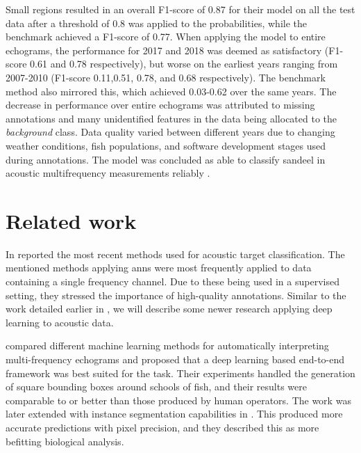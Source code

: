     Small regions resulted in an overall F1-score of 0.87 for their model on all the test data after a threshold of 0.8 was applied to the probabilities, while the benchmark achieved a F1-score of 0.77. When applying the model to entire echograms, the performance for 2017 and 2018 was deemed as satisfactory (F1-score 0.61 and 0.78 respectively), but worse on the earliest years ranging from 2007-2010 (F1-score 0.11,0.51, 0.78, and 0.68 respectively). The benchmark method also mirrored this, which achieved 0.03-0.62 over the same years. The decrease in performance over entire echograms was attributed to missing annotations and many unidentified features in the data being allocated to the \textit{background} class. Data quality varied between different years due to changing weather conditions, fish populations, and software development stages used during annotations. The model was concluded as able to classify sandeel in acoustic multifrequency measurements reliably \cite{brautaset2020acoustic}.

\section{Related work} \label{related_work}
In \citeyear{korneliussen2018acoustic} \citet{korneliussen2018acoustic} reported the most recent methods used for acoustic target classification. The mentioned methods applying \gls{ann}s were most frequently applied to data containing a single frequency channel. Due to these being used in a supervised setting, they stressed the importance of high-quality annotations. Similar to the work detailed earlier in \citet{brautaset2020acoustic}, we will describe some newer research applying deep learning to acoustic data.
   
\citet{marques2021detecting} compared different machine learning methods for automatically interpreting multi-frequency echograms and proposed that a deep learning based end-to-end framework was best suited for the task. Their experiments handled the generation of square bounding boxes around schools of fish, and their results were comparable to or better than those produced by human operators. The work was later extended with instance segmentation capabilities in \citeyear{marques2021instance} \cite{marques2021instance}. This produced more accurate predictions with pixel precision, and they described this as more befitting biological analysis.
 
